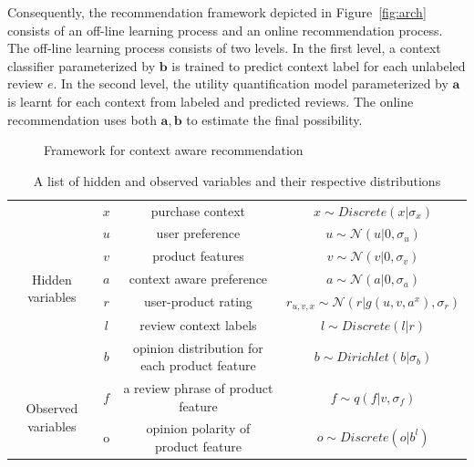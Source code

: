 \documentclass[preprint,12pt]{elsarticle}
\begin{document}
Consequently, the recommendation framework depicted in Figure~\ref{fig:arch} consists of an off-line learning process and an online recommendation process. The off-line learning process consists of two levels. In the first level, a context classifier  parameterized by $\mathbf{b}$ is trained to predict context label for each unlabeled review $e$. In the second level, the utility quantification model parameterized by $\mathbf{a}$ is learnt for each context from labeled and predicted reviews. The online recommendation uses both $\mathbf{a,b}$ to estimate the final possibility.
\begin{figure}
\centering
\vskip -0.1in
\caption{Framework for context aware recommendation}

\end{figure}


\begin{table}
	\caption{A list of hidden and observed variables and their respective distributions}
	\label{tab:Notations}
	 \begin{tabular}{|cccc|}
	\hline
	\multirow{7}{*}{Hidden variables}& $x$ & purchase context & $x\sim Discrete(x|\sigma_x)$\\ 
	& $u$ & user preference & $u\sim \mathcal{N}(u|0,\sigma_u)$\\ 
	& $v$ & product features & $v\sim \mathcal{N}(v|0,\sigma_v)$\\
	& $a$ & context aware preference & $a\sim \mathcal{N}(a|0,\sigma_a)$\\
	& $r$ & user-product rating & $r_{u,v,x}\sim \mathcal{N}(r|g(u,v,a^x),\sigma_r)$\\
	& $l$ & review context labels & $l\sim Discrete(l|r)$\\
	& $b$ & opinion distribution for each product feature & $b\sim Dirichlet(b|\sigma_b)$\\
	\multirow{2}{*}{Observed variables}& $f$ & a review phrase of product feature & $f\sim q(f|v,\sigma_f)$\\ 
	& o & opinion polarity of product feature & $o\sim Discrete(o|b^l)$\\ \hline
	\end{tabular}
\end{table}
\end{document}
